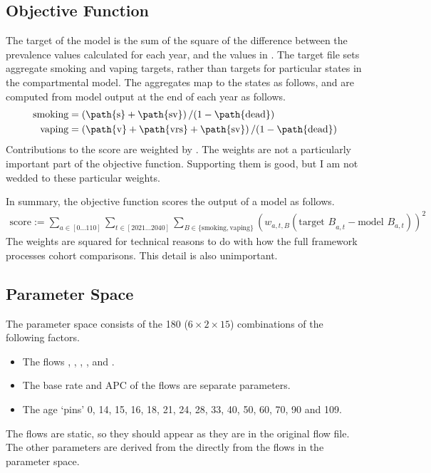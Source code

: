 \documentclass[]{article}
\begin{document}
	\subsection{Objective Function}
	The target of the model is the sum of the square of the difference between the prevalence values calculated for each year, and the values in . The target file sets aggregate smoking and vaping targets, rather than targets for particular states in the compartmental model. The aggregates map to the states as follows, and are computed from model output at the end of each year as follows.
	\begin{align*}
		\text{smoking} &= \left(\text{\path{s}} + \text{\path{sv}}\right) / (1 - \text{\path{dead}}) \\
		\text{vaping} &= \left(\text{\path{v}} + \text{\path{vrs}} + \text{\path{sv}}\right) / (1 - \text{\path{dead}})
	\end{align*}
	Contributions to the score are weighted by . The weights are not a particularly important part of the objective function. Supporting them is good, but I am not wedded to these particular weights.
	
	In summary, the objective function scores the output of a model as follows.
	\begin{align*}
		\text{score} := \sum_{a \in [0\ldots110]} \sum_{t \in [2021\ldots2040]} \sum_{B \in \{\text{smoking}, \text{vaping}\}}\left(w_{a, t, B} \left(\text{target $B$}_{a, t} - \text{model $B$}_{a, t}\right)\right)^2
	\end{align*}
	The weights are squared for technical reasons to do with how the full framework processes cohort comparisons. This detail is also unimportant.
	
	\subsection{Parameter Space}
	The parameter space consists of the 180 ($6 \times 2 \times 15$) combinations of the following factors.
	\begin{itemize}
		\item The flows , , , ,  and .
		\item The base rate and APC of the flows are separate parameters.
		\item The age `pins' 0, 14, 15, 16, 18, 21, 24, 28, 33, 40, 50, 60, 70, 90 and 109.
	\end{itemize}
	The  flows are static, so they should appear as they are in the original flow file. The other parameters are derived from the directly from the flows in the parameter space.
	
\end{document}
